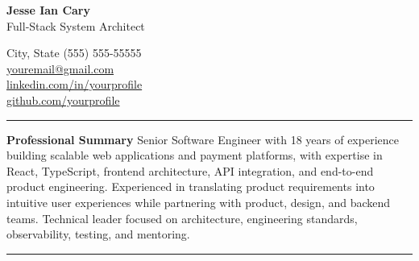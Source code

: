 \documentclass[10pt]{article}
\makeatletter
\newcommand{\sectionlabel}[1]{%
  \par\vspace{-8pt}%
  \noindent\textcolor{lightgray}{\rule{\textwidth}{0.3pt}}\par\vspace{-2pt}%
  \noindent{\bfseries\large #1}\par\vspace{-4pt}%
}
\newcommand{\MyName}{Jesse Ian Cary}
\newcommand{\MyTitle}{Full‐Stack System Architect}
\newcommand{\MyCity}{City}
\newcommand{\MyState}{State}
\newcommand{\MyPhone}{(555) 555-55555}
\newcommand{\MyEmail}{youremail@gmail.com}
\newcommand{\MyLinkedIn}{linkedin.com/in/yourprofile}
\newcommand{\MyGitHub}{github.com/yourprofile}
\makeatother
\begin{document}

\begin{minipage}[b]{0.5\linewidth}
  {\Huge \textbf{\MyName}}\\[2pt]
  {\large \MyTitle}
\end{minipage}%
\begin{minipage}[b]{0.5\linewidth}
  \raggedleft
  {\small\color{lighttext}
    {\MyCity, \MyState}  {\MyPhone}\\
    \href{mailto:\MyEmail}{\MyEmail}\\
    \href{https://\MyLinkedIn}{\MyLinkedIn}\\
    \href{https://\MyGitHub}{\MyGitHub}\\
  }
\end{minipage}

\par\vspace{-8pt}%
\noindent\textcolor{lightgray}{\rule{\textwidth}{0.3pt}}\par\vspace{-6pt}%
\begin{entryrow}{\bfseries\large Professional Summary}
  Senior Software Engineer with 18 years of experience building scalable web applications and payment platforms, with expertise in React, TypeScript, frontend architecture, API integration, and end-to-end product engineering. Experienced in translating product requirements into intuitive user experiences while partnering with product, design, and backend teams. Technical leader focused on architecture, engineering standards, observability, testing, and mentoring.
\end{entryrow}

\sectionlabel{Skills}
\end{document}

